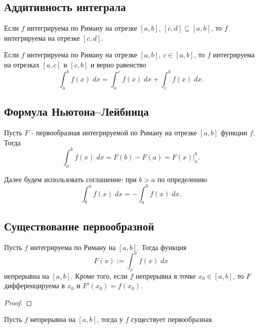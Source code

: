     \subsection{Аддитивность интеграла}
    
    \begin{corollary}
    	Если $f$ интегрируема по Риману на отрезке $[a, b]$, $[c, d] \subseteq [a, b]$, то $f$ интегрируема на отрезке $[c, d]$.
    \end{corollary}
    
    \begin{corollary}
    	Если $f$ интегрируема по Риману на отрезке $[a, b]$, $c \in [a, b]$, то $f$ интегрируема на отрезках $[a, c]$ и $[c, b]$ и верно равенство
    	\[ \int_a^b f(x) \; dx = \int_a^c f(x) \; dx + \int_c^b f(x) \; dx. \]
    \end{corollary}
    
    \subsection{Формула Ньютона–Лейбница}
    
    \begin{theorem}
    	Пусть $F$ - первообразная интегрируемой по Риману на отрезке
    	$[a, b]$ функции $f$. Тогда
    	\[ \int_{a}^{b} f(x) \; dx = F(b) - F(a) = F(x)\bigg|_{a}^{b}. \]
    \end{theorem}
    
    Далее будем использовать соглашение: при $b > a$ по
    определению 
    \[ \displaystyle\int_{b}^{a} f(x) \; dx = -\displaystyle\int_{a}^{b} f(x) \; dx.\]
    
    \subsection{Существование первообразной}
    
    \begin{theorem}
    	Пусть $f$ интегрируема по Риману на $[a, b]$. Тогда функция
    	\[ F(x) := \int_a^{x} f(x) \; dx \]
    	непрерывна на $[a, b]$. Кроме того, если $f$ непрерывна в точке
    	$x_0 \in [a, b]$, то $F$ дифференцируема в $x_0$ и $F'(x_0) = f(x_0)$.
    \end{theorem}
    
    \begin{proof}
    \end{proof}
    
    \begin{corollary}
    	Пусть $f$ непрерывна на $[a, b]$, тогда у $f$ существует
    	первообразная.
    \end{corollary}
    
